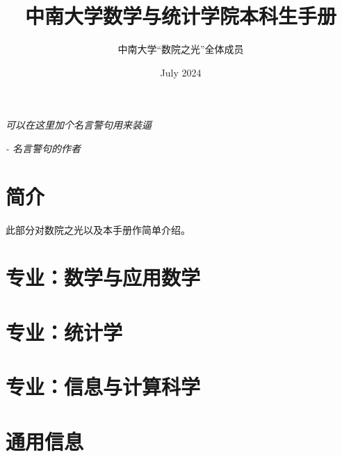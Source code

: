 \documentclass{book}
\title{中南大学数学与统计学院本科生手册}
\author{中南大学“数院之光”全体成员}
\date{July 2024}
\begin{document}
\maketitle

\hspace{64pt}
\begin{center}
\textit{可以在这里加个名言警句用来装逼}
\end{center}
\begin{flushright}
\textit{ - 名言警句的作者}
\end{flushright}



\pagestyle{fancy}
\fancyhead{}
\fancyhead[LE]{\textsl{\rightmark}}
\fancyhead[RO]{\textsl{\leftmark}}
\renewcommand{\headrulewidth}{1pt} %
\renewcommand{\footrulewidth}{0pt}

\setlength{\parskip}{.5em}
\setlength{\lineskiplimit}{2em}
\setlength{\lineskip}{2pt}

\tableofcontents


\chapter{简介}

此部分对数院之光以及本手册作简单介绍。


\chapter{专业：数学与应用数学}


\chapter{专业：统计学}


\chapter{专业：信息与计算科学}







\chapter{通用信息}
\end{document}
